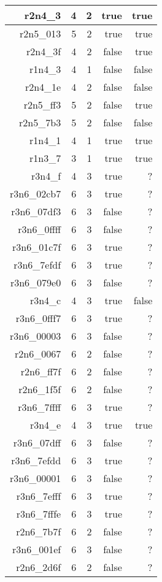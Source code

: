 \begin{center}
\begin{longtable}{rrrrr}
  r2n4\_3 & 4 & 2 & true & true \\ \hline
  r2n5\_013 & 5 & 2 & true & true \\ \hline
  r2n4\_3f & 4 & 2 & false & true \\ \hline
  r1n4\_3 & 4 & 1 & false & false \\ \hline
  r2n4\_1e & 4 & 2 & false & false \\ \hline
  r2n5\_ff3 & 5 & 2 & false & true \\ \hline
  r2n5\_7b3 & 5 & 2 & false & false \\ \hline
  r1n4\_1 & 4 & 1 & true & true \\ \hline
  r1n3\_7 & 3 & 1 & true & true \\ \hline
  r3n4\_f & 4 & 3 & true & ? \\ \hline
  r3n6\_02cb7 & 6 & 3 & true & ? \\ \hline
  r3n6\_07df3 & 6 & 3 & false & ? \\ \hline
  r3n6\_0ffff & 6 & 3 & false & ? \\ \hline
  r3n6\_01c7f & 6 & 3 & true & ? \\ \hline
  r3n6\_7efdf & 6 & 3 & true & ? \\ \hline
  r3n6\_079e0 & 6 & 3 & false & ? \\ \hline
  r3n4\_c & 4 & 3 & true & false \\ \hline
  r3n6\_0fff7 & 6 & 3 & true & ? \\ \hline
  r3n6\_00003 & 6 & 3 & false & ? \\ \hline
  r2n6\_0067 & 6 & 2 & false & ? \\ \hline
  r2n6\_ff7f & 6 & 2 & false & ? \\ \hline
  r2n6\_1f5f & 6 & 2 & false & ? \\ \hline
  r3n6\_7ffff & 6 & 3 & true & ? \\ \hline
  r3n4\_e & 4 & 3 & true & true \\ \hline
  r3n6\_07dff & 6 & 3 & false & ? \\ \hline
  r3n6\_7efdd & 6 & 3 & true & ? \\ \hline
  r3n6\_00001 & 6 & 3 & false & ? \\ \hline
  r3n6\_7efff & 6 & 3 & true & ? \\ \hline
  r3n6\_7fffe & 6 & 3 & true & ? \\ \hline
  r2n6\_7b7f & 6 & 2 & false & ? \\ \hline
  r3n6\_001ef & 6 & 3 & false & ? \\ \hline
  r2n6\_2d6f & 6 & 2 & false & ? \\ \hline

\end{longtable}
\end{center}
